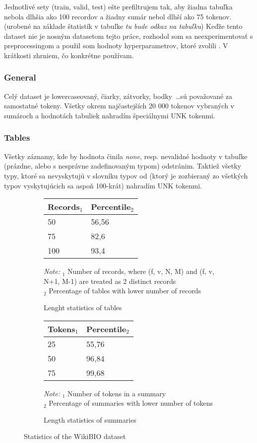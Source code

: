 Jednotlivé sety (train, valid, test) ešte prefiltrujem tak, aby žiadna tabuľka nebola dlhšia ako 100 recordov a žiadny sumár nebol dlhší ako 75 tokenov. (urobené na základe štatistík v tabuľke \emph{tu bude odkaz na tabuľku}) Keďže tento dataset nie je nosným datasetom tejto práce, rozhodol som sa neexperimentovať s preprocessingom a použil som hodnoty hyperparametrov, ktoré zvolili \citep{liu2017tabletotext}. V krátkosti zhrniem, čo konkrétne používam.

\subsubsection{General}

Celý dataset je lowercaseovaný, čiarky, zátvorky, bodky \dots sú považované za samostatné tokeny. Všetky okrem najčastejších 20 000 tokenov vybraných \citep{liu2017tabletotext} v sumároch a hodnotách tabuliek nahradím špeciálnymi UNK tokenmi.

\subsubsection{Tables}

Všetky záznamy, kde by hodnota činila \emph{none}, resp. nevalidné hodnoty v tabuľke (prázdne, alebo s nesprávne zadefinovaným typom) odstránim. Taktiež všetky typy, ktoré sa nevyskytujú v slovníku typov od \citep{liu2017tabletotext} (ktorý je zozbieraný zo všetkých typov vyskytujúcich sa aspoň 100-krát) nahradím UNK tokenmi.

\begin{figure}[!h]
\centering
\begin{subfigure}[t]{0.45\textwidth}
    \centering
    \begin{tabular}{ll}
        \toprule
        Records$_1$ & Percentile$_2$\\
        \midrule
        50     & 56,56 \\
        75     & 82,6 \\
        100    & 93,4
    \end{tabular}
\caption{Lenght statistics of tables}
\footnotesize \textit{Note:} $_1$ Number of records, where (f, v, N, M) and (f, v, N+1, M-1) are treated as 2 distinct records \\ $_2$ Percentage of tables with lower number of records
\end{subfigure}
\begin{subfigure}[t]{0.45\textwidth}
    \centering
    \begin{tabular}{ll}
        \toprule
        Tokens$_1$ & Percentile$_2$\\
        \midrule
        25     & 55,76 \\
        50     & 96,84 \\
        75     & 99,68
    \end{tabular}
    \caption{Length statistics of  summaries}
    \footnotesize \textit{Note:} $_1$ Number of tokens in a summary \\ $_2$ Percentage of summaries with lower number of tokens
\end{subfigure}
\caption{Statistics of the WikiBIO dataset} \label{stats_filtering_wb}
\end{figure}


